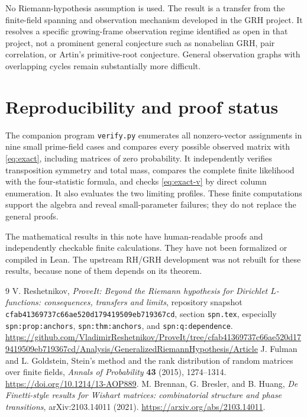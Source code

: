 \documentclass[11pt]{article}
\theoremstyle{remark}\newtheorem{remark}[theorem]{Remark}
\begin{document}
No Riemann-hypothesis assumption is used. The result is a transfer from the finite-field spanning and observation mechanism developed in the GRH project. It resolves a specific growing-frame observation regime identified as open in that project, not a prominent general conjecture such as nonabelian GRH, pair correlation, or Artin's primitive-root conjecture. General observation graphs with overlapping cycles remain substantially more difficult.

\section{Reproducibility and proof status}
The companion program \texttt{verify.py} enumerates all nonzero-vector assignments in nine small prime-field cases and compares every possible observed matrix with \eqref{eq:exact}, including matrices of zero probability. It independently verifies transposition symmetry and total mass, compares the complete finite likelihood with the four-statistic formula, and checks \eqref{eq:exact-v} by direct column enumeration. It also evaluates the two limiting profiles. These finite computations support the algebra and reveal small-parameter failures; they do not replace the general proofs.

The mathematical results in this note have human-readable proofs and independently checkable finite calculations. They have not been formalized or compiled in Lean. The upstream RH/GRH development was not rebuilt for these results, because none of them depends on its theorem.

\begin{thebibliography}{9}
V. Reshetnikov, \emph{ProveIt: Beyond the Riemann hypothesis for Dirichlet $L$-functions: consequences, transfers and limits}, repository snapshot \texttt{cfab41369737c66ae520d179419509eb719367cd}, section \texttt{spn.tex}, especially \texttt{spn:prop:anchors}, \texttt{spn:thm:anchors}, and \texttt{spn:q:dependence}.\newline
\url{https://github.com/VladimirReshetnikov/ProveIt/tree/cfab41369737c66ae520d179419509eb719367cd/Analysis/GeneralizedRiemannHypothesis/Article}
J. Fulman and L. Goldstein, Stein's method and the rank distribution of random matrices over finite fields, \emph{Annals of Probability} \textbf{43} (2015), 1274--1314.\newline
\url{https://doi.org/10.1214/13-AOP889}.
M. Brennan, G. Bresler, and B. Huang, \emph{De Finetti-style results for Wishart matrices: combinatorial structure and phase transitions}, arXiv:2103.14011 (2021).\newline
\url{https://arxiv.org/abs/2103.14011}.
\end{thebibliography}
\end{document}
